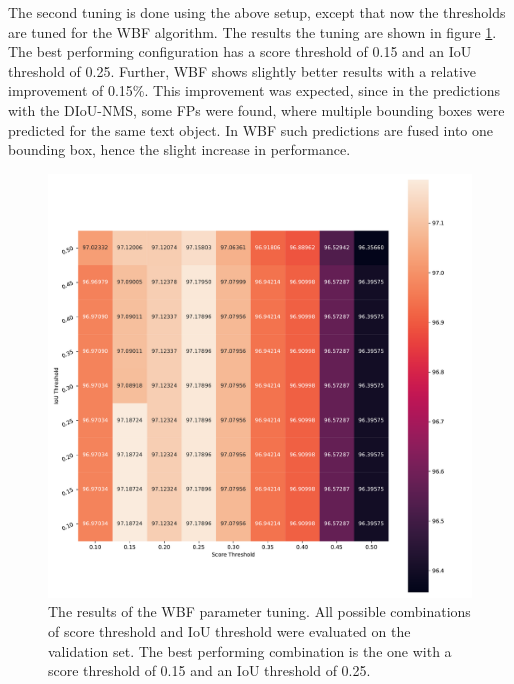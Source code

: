 The second tuning is done using the above setup, except that now the thresholds are tuned for the \ac{WBF} algorithm.
The results the tuning are shown in figure \ref{fig:wbf_nms_tuning}.
The best performing configuration has a score threshold of 0.15 and an \ac{IoU} threshold of 0.25.
Further, \ac{WBF} shows slightly better results with a relative improvement of 0.15\%.
This improvement was expected, since in the predictions with the DIoU-NMS, some \acp{FP} were found, where multiple bounding boxes were predicted for the same text object.
In \ac{WBF} such predictions are fused into one bounding box, hence the slight increase in performance.

\begin{figure}
\begin{center}
    \includegraphics[width=\columnwidth]{imgs/yolo_wbf_heat.pdf}
    \caption{The results of the \ac{WBF} parameter tuning. All possible combinations of score threshold and \ac{IoU} threshold were evaluated on the validation set. The best performing combination is the one with a score threshold of 0.15 and an \ac{IoU} threshold of 0.25.}
    \label{fig:wbf_nms_tuning}
\end{center}
\end{figure}

